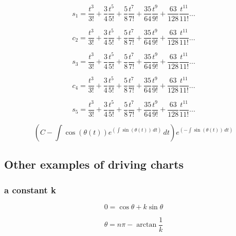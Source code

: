 \documentclass{article}
\begin{document}
\begin{equation}
   s_1 = \frac{t^3}{3!} + \frac{3}{4}\frac{t^5}{5!} + \frac{5}{8} \frac{t^7}{7!} + \frac{35}{64} \frac{t^9}{9!} + \frac{63}{128} \frac{t^{11}}{11!}  ...
\end{equation}

\begin{equation}
   c_2 = \frac{t^3}{3!} + \frac{3}{4}\frac{t^5}{5!} + \frac{5}{8} \frac{t^7}{7!} + \frac{35}{64} \frac{t^9}{9!} + \frac{63}{128} \frac{t^{11}}{11!}  ...
\end{equation}

\begin{equation}
   s_3 = \frac{t^3}{3!} + \frac{3}{4}\frac{t^5}{5!} + \frac{5}{8} \frac{t^7}{7!} + \frac{35}{64} \frac{t^9}{9!} + \frac{63}{128} \frac{t^{11}}{11!}  ...
\end{equation}

\begin{equation}
   c_4 = \frac{t^3}{3!} + \frac{3}{4}\frac{t^5}{5!} + \frac{5}{8} \frac{t^7}{7!} + \frac{35}{64} \frac{t^9}{9!} + \frac{63}{128} \frac{t^{11}}{11!}  ...
\end{equation}

\begin{equation}
   s_5 = \frac{t^3}{3!} + \frac{3}{4}\frac{t^5}{5!} + \frac{5}{8} \frac{t^7}{7!} + \frac{35}{64} \frac{t^9}{9!} + \frac{63}{128} \frac{t^{11}}{11!}  ...
\end{equation}

\begin{equation}
    {\left(C - \int \cos\left(\theta\left(t\right)\right) e^{\left(\int \sin\left(\theta\left(t\right)\right)\,{d t}\right)}\,{d t}\right)} e^{\left(-\int \sin\left(\theta\left(t\right)\right)\,{d t}\right)}
\end{equation}


\subsection{Other examples of driving charts}\label{sec:meodc}

\subsubsection{a constant k}

\begin{equation}
    0 = \cos \theta + k \sin \theta
\end{equation}

\begin{equation}
    \theta = n\pi - \arctan \frac{1}{k}
\end{equation}
\end{document}
